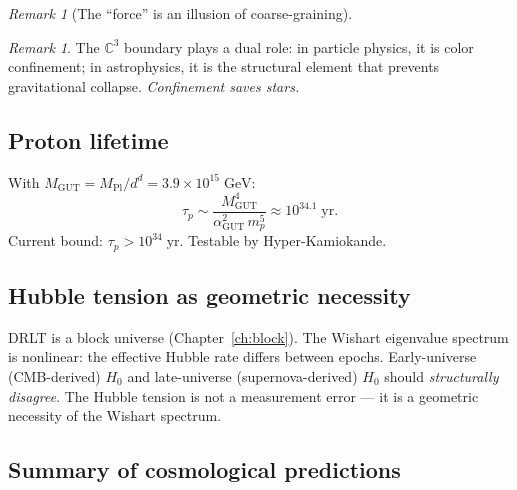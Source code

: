 \documentclass[12pt]{article}
\theoremstyle{remark}
\newtheorem{remark}[theorem]{Remark}
\theoremstyle{definition}
\newcommand{\CC}{\mathbb{C}}
\begin{document}
\begin{remark}[The ``force'' is an illusion of coarse-graining]
\begin{remark}
The $\CC^3$ boundary plays a dual role: in particle physics, it is color confinement; in astrophysics, it is the structural element that prevents gravitational collapse. \emph{Confinement saves stars.}
\end{remark}

\subsection{Proton lifetime}

With $M_\text{GUT} = M_\text{Pl}/d^d = 3.9 \times 10^{15}\;\text{GeV}$:
\begin{equation}
\tau_p \sim \frac{M_\text{GUT}^4}{\alpha_\text{GUT}^2\,m_p^5} \approx 10^{34.1}\;\text{yr}.
\end{equation}
Current bound: $\tau_p > 10^{34}\;\text{yr}$. Testable by Hyper-Kamiokande.

\subsection{Hubble tension as geometric necessity}

DRLT is a block universe (Chapter~\ref{ch:block}). The Wishart eigenvalue spectrum is nonlinear: the effective Hubble rate differs between epochs. Early-universe (CMB-derived) $H_0$ and late-universe (supernova-derived) $H_0$ should \emph{structurally disagree}. The Hubble tension is not a measurement error --- it is a geometric necessity of the Wishart spectrum.

\subsection{Summary of cosmological predictions}


\end{remark}
\end{document}
